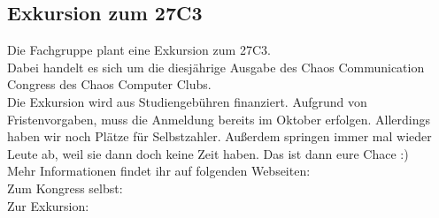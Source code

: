 \subsection{Exkursion zum 27C3}
Die Fachgruppe plant eine Exkursion zum 27C3. \\Dabei handelt es sich um
die diesjährige Ausgabe des Chaos Communication Congress des Chaos
Computer Clubs.\\ Die Exkursion wird aus
Studiengebühren finanziert. Aufgrund von Fristenvorgaben, muss die
Anmeldung bereits im Oktober erfolgen. Allerdings haben wir noch Plätze
für Selbstzahler. Außerdem springen immer mal wieder
Leute ab, weil sie dann doch keine Zeit haben. Das ist dann eure Chace
:)\\
Mehr Informationen findet ihr auf folgenden
Webseiten:\\
Zum Kongress selbst: \\
Zur Exkursion: 
